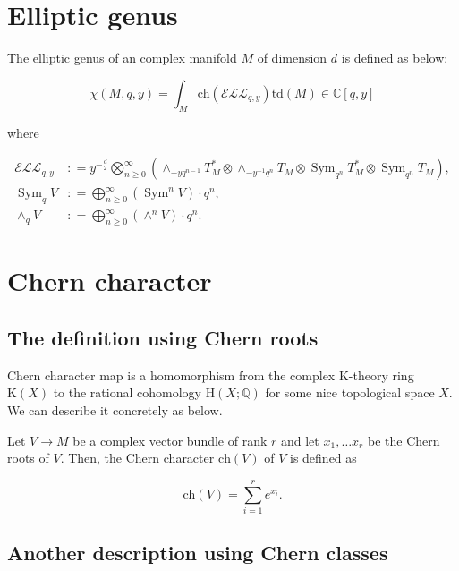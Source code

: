 \documentclass[uplatex,dvipdfmx]{jsarticle}
\newcommand{\defeq}{\mathrel{\mathop:}=}
\newcommand{\ch}[1]{\mathrm{ch}\left( {#1} \right)}
\newcommand{\td}[1]{\mathrm{td}\left( {#1} \right)}
\DeclareMathOperator{\Sym}{Sym}
\begin{document}
\section{Elliptic genus}

The elliptic genus of an complex manifold 
$M$
of dimension 
$d$
is defined as below:

\begin{equation}
    \chi(M, q, y)
    =
    \int_M
    \ch{\mathcal{ELL}_{q,y}}
    \td{M}
    \in
    \mathbb{C}[ q, y ]
\end{equation}

where

\begin{align}
    \mathcal{ELL}_{q, y}
    &\defeq
    y^{- \frac{d}{2}}
    \bigotimes_{n \geq 0}^{\infty}
    \left( 
        \wedge_{-yq^{n-1}} T_M^*
        \otimes
        \wedge_{-y^{-1}q^n} T_M
        \otimes
        \Sym_{q^n} T_M^*
        \otimes
        \Sym_{q^n}T_M
    \right), \\
    \Sym_q V
    &\defeq
    \bigoplus_{n \geq 0} ^{\infty}
    \left( 
        \Sym^n V
    \right)
    \cdot
    q^n, \\
    \wedge_q V
    &\defeq
    \bigoplus_{n \geq 0}^{\infty}
    \left( 
        \wedge^n V
    \right)
    \cdot
    q^n.
\end{align}

\section{Chern character}

\subsection{The definition using Chern roots}

Chern character map is a homomorphism from the complex K-theory ring
$\mathrm{K}(X)$
to the rational cohomology
$\mathrm{H}(X; \mathbb{Q})$
for some nice topological space
$X$.
We can describe it concretely as below.

Let 
$V \to M$ 
be a complex vector bundle of rank 
$r$
and let
$x_1, \ldots x_r$
be the Chern roots of
$V$.
Then, the Chern character 
$\ch{V}$ 
of 
$V$ 
is defined as

\begin{equation}
    \ch{V} 
    = 
    \sum_{i=1}^{r}
    e^{x_i}.
\end{equation}

\subsection{Another description using Chern classes}
\end{document}
